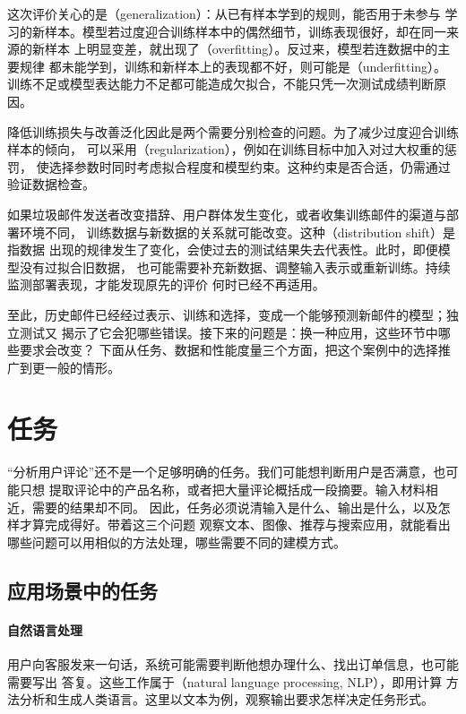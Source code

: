 这次评价关心的是（generalization）：从已有样本学到的规则，能否用于未参与
学习的新样本。模型若过度迎合训练样本中的偶然细节，训练表现很好，却在同一来源的新样本
上明显变差，就出现了（overfitting）。反过来，模型若连数据中的主要规律
都未能学到，训练和新样本上的表现都不好，则可能是（underfitting）。
训练不足或模型表达能力不足都可能造成欠拟合，不能只凭一次测试成绩判断原因。

降低训练损失与改善泛化因此是两个需要分别检查的问题。为了减少过度迎合训练样本的倾向，
可以采用（regularization），例如在训练目标中加入对过大权重的惩罚，
使选择参数时同时考虑拟合程度和模型约束。这种约束是否合适，仍需通过验证数据检查。

如果垃圾邮件发送者改变措辞、用户群体发生变化，或者收集训练邮件的渠道与部署环境不同，
训练数据与新数据的关系就可能改变。这种（distribution shift）是指数据
出现的规律发生了变化，会使过去的测试结果失去代表性。此时，即便模型没有过拟合旧数据，
也可能需要补充新数据、调整输入表示或重新训练。持续监测部署表现，才能发现原先的评价
何时已经不再适用。

至此，历史邮件已经经过表示、训练和选择，变成一个能够预测新邮件的模型；独立测试又
揭示了它会犯哪些错误。接下来的问题是：换一种应用，这些环节中哪些要求会改变？
下面从任务、数据和性能度量三个方面，把这个案例中的选择推广到更一般的情形。

\section{任务}
\label{sec:machine-learning-tasks}

“分析用户评论”还不是一个足够明确的任务。我们可能想判断用户是否满意，也可能只想
提取评论中的产品名称，或者把大量评论概括成一段摘要。输入材料相近，需要的结果却不同。
因此，任务必须说清输入是什么、输出是什么，以及怎样才算完成得好。带着这三个问题
观察文本、图像、推荐与搜索应用，就能看出哪些问题可以用相似的方法处理，哪些需要不同的建模方式。

\subsection{应用场景中的任务}

\paragraph{自然语言处理}
用户向客服发来一句话，系统可能需要判断他想办理什么、找出订单信息，也可能需要写出
答复。这些工作属于（natural language processing, NLP），即用计算
方法分析和生成人类语言。这里以文本为例，观察输出要求怎样决定任务形式。

